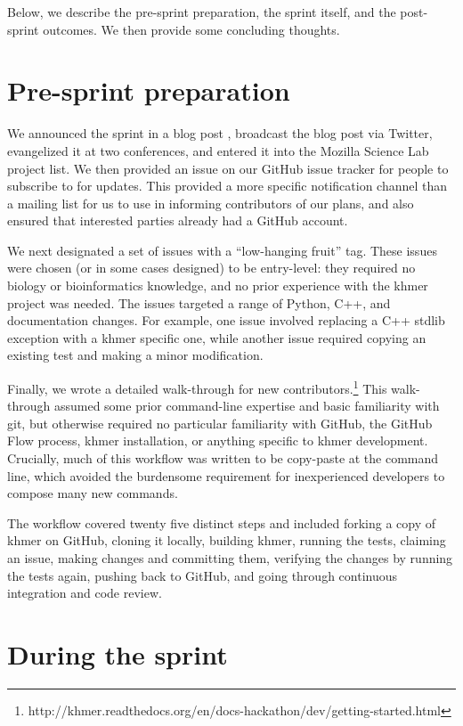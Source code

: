 \documentclass[11pt]{article}
\begin{document}
Below, we describe the pre-sprint preparation, the sprint itself, and the
post-sprint outcomes.  We then provide some concluding thoughts.

\section{Pre-sprint preparation}

We announced the sprint in a blog post \cite{blogpost}, broadcast the
blog post via Twitter, evangelized it at two conferences, and entered
it into the Mozilla Science Lab project list.  We then provided an
issue on our GitHub issue tracker for people to subscribe to for
updates.  This provided a more specific notification channel than a
mailing list for us to use in informing contributors of our plans, and
also ensured that interested parties already had a GitHub account.

We next designated a set of issues with a ``low-hanging fruit'' tag.
These issues were chosen (or in some cases designed) to be
entry-level: they required no biology or bioinformatics knowledge, and
no prior experience with the khmer project was needed.  The issues
targeted a range of Python, C++, and documentation changes.  For
example, one issue involved replacing a C++ stdlib exception with a
khmer specific one, while another issue required copying an existing
test and making a minor modification.

Finally, we wrote a detailed walk-through for new
contributors.\footnote{http://khmer.readthedocs.org/en/docs-hackathon/dev/getting-started.html}
This walk-through assumed some prior command-line expertise and basic
familiarity with git, but otherwise required no particular familiarity
with GitHub, the GitHub Flow process, khmer installation, or anything
specific to khmer development.  Crucially, much of this workflow was
written to be copy-paste at the command line, which avoided the
burdensome requirement for inexperienced developers to compose many
new commands.

The workflow covered twenty five distinct steps and included forking a
copy of khmer on GitHub, cloning it locally, building khmer, running
the tests, claiming an issue, making changes and committing them,
verifying the changes by running the tests again, pushing back to
GitHub, and going through continuous integration and code review.

\section{During the sprint}
\end{document}
